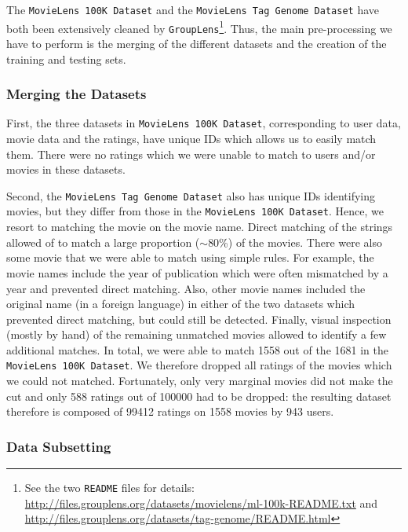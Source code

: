 \documentclass[bj, preprint]{imsart}
\begin{document}
The \texttt{MovieLens 100K Dataset} and the \texttt{MovieLens Tag Genome Dataset} have both been extensively cleaned by \texttt{GroupLens}\footnote{See the two \texttt{README} files for details: \url{http://files.grouplens.org/datasets/movielens/ml-100k-README.txt} and \url{http://files.grouplens.org/datasets/tag-genome/README.html}}. 
Thus, the main pre-processing we have to perform is the merging of the different datasets and the creation of the training and testing sets.

\subsubsection{Merging the Datasets}\label{subsubsec:method.preprocess.merge}

First, the three datasets in \texttt{MovieLens 100K Dataset}, corresponding to user data, movie data and the ratings, have unique IDs which allows us to easily match them. 
There were no ratings which we were unable to match to users and/or movies in these datasets.

Second, the \texttt{MovieLens Tag Genome Dataset} also has unique IDs identifying movies, but they differ from those in the \texttt{MovieLens 100K Dataset}. 
Hence, we resort to matching the movie on the movie name. 
Direct matching of the strings allowed of to match a large proportion ($\sim$80\%) of the movies. 
There were also some movie that we were able to match using simple rules. 
For example, the movie names include the year of publication which were often mismatched by a year and prevented direct matching. 
Also, other movie names included the original name (in a foreign language) in either of the two datasets which prevented direct matching, but could still be detected. 
Finally, visual inspection (mostly by hand) of the remaining unmatched movies allowed to identify a few additional matches.
In total, we were able to match \num{1558} out of the \num{1681} in the \texttt{MovieLens 100K Dataset}. 
We therefore dropped all ratings of the movies which we could not matched. Fortunately, only very marginal movies did not make the cut and only \num{588} ratings out of \num{100000} had to be dropped: the resulting dataset therefore is composed of \num{99412} ratings on \num{1558} movies by \num{943} users. 

\subsubsection{Data Subsetting}\label{subsubsec:method.preprocess.subset}
\end{document}
